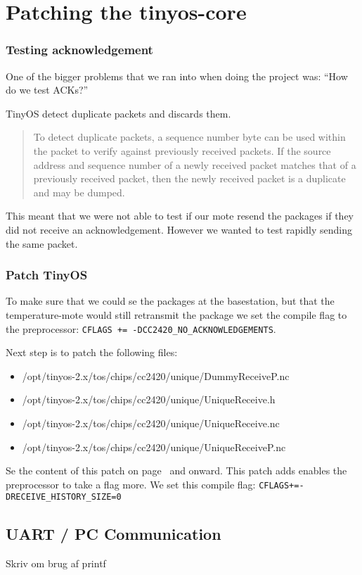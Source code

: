 \section{Patching the tinyos-core}

\subsubsection{Testing acknowledgement}
One of the bigger problems that we ran into when doing the project was: ``How
do we test ACKs?''

TinyOS detect duplicate packets and discards them.

\begin{quote}
To detect duplicate packets, a sequence number byte can be used within the
packet to verify against previously received packets. If the source address and
sequence number of a newly received packet matches that of a previously
received packet, then the newly received packet is a duplicate and may be
dumped.\cite[chapter 2.2]{PaketLink}
\end{quote}


This meant that we were not
able to test if our mote resend the packages if they did not receive an
acknowledgement. However we wanted to test rapidly sending the
same packet. 

\subsubsection{Patch TinyOS}

To make sure that we could se the packages at the basestation, but that the
temperature-mote would still retransmit the package we set the compile flag to
the preprocessor: \texttt{CFLAGS += -DCC2420\_NO\_ACKNOWLEDGEMENTS}.

Next step is to patch the following files: 

\begin{itemize}
	\item /opt/tinyos-2.x/tos/chips/cc2420/unique/DummyReceiveP.nc
	\item /opt/tinyos-2.x/tos/chips/cc2420/unique/UniqueReceive.h
	\item /opt/tinyos-2.x/tos/chips/cc2420/unique/UniqueReceive.nc
	\item /opt/tinyos-2.x/tos/chips/cc2420/unique/UniqueReceiveP.nc
\end{itemize}

Se the content of this patch on page~ and onward. This
patch adds enables the preprocessor to take a flag more. We set this compile
flag: \texttt{CFLAGS+=-DRECEIVE\_HISTORY\_SIZE=0}

\subsection{UART / PC Communication}
Skriv om brug af printf
	
